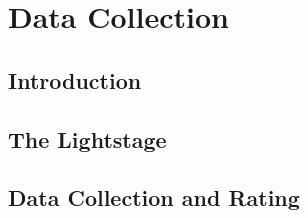 
\chapter{Data Collection} %

\label{data_collection} %



\section{Introduction}


\section{The Lightstage}


\section{Data Collection and Rating}

